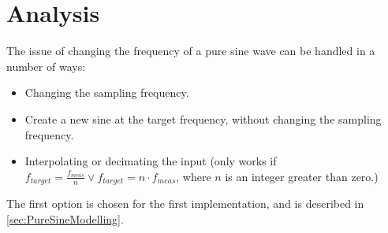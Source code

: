 
\section{Analysis}
The issue of changing the frequency of a pure sine wave can be handled in a number of ways:
\begin{itemize}
	\item Changing the sampling frequency.
	\item Create a new sine at the target frequency, without changing the sampling frequency.
	\item Interpolating or decimating the input (only works if $f_{target}=\frac{f_{meas}}{n}\vee f_{target} =n\cdot f_{meas}$, where $n$ is an integer greater than zero.)
\end{itemize}

The first option is chosen for the first implementation, and is described in \cref{sec:PureSineModelling}.